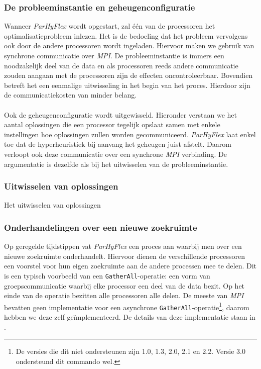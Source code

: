 \subsubsection{De probleeminstantie en geheugenconfiguratie}

Wanneer \emph{ParHyFlex} wordt opgestart, zal \'e\'en van de processoren het optimalisatieprobleem inlezen. Het is de bedoeling dat het probleem vervolgens ook door de andere processoren wordt ingeladen. Hiervoor maken we gebruik van synchrone communicatie over \emph{MPI}. De probleeminstantie is immers een noodzakelijk deel van de data en als processoren reeds andere communicatie zouden aangaan met de processoren zijn de effecten oncontroleerbaar. Bovendien betreft het een eenmalige uitwisseling in het begin van het proces. Hierdoor zijn de communicatiekosten van minder belang.

\paragraph{}
Ook de geheugenconfiguratie wordt uitgewisseld. Hieronder verstaan we het aantal oplossingen die een processor tegelijk opslaat samen met enkele instellingen hoe oplossingen zullen worden gecommuniceerd. \emph{ParHyFlex} laat enkel toe dat de hyperheuristiek bij aanvang het geheugen juist afstelt. Daarom verloopt ook deze communicatie over een synchrone \emph{MPI} verbinding. De argumentatie is dezelfde als bij het uitwisselen van de probleeminstantie.

\subsubsection{Uitwisselen van oplossingen}

Het uitwisselen van oplossingen %

\subsubsection{Onderhandelingen over een nieuwe zoekruimte}

Op geregelde tijdstippen vat \emph{ParHyFlex} een proces aan waarbij men over een nieuwe zoekruimte onderhandelt. Hiervoor dienen de verschillende processoren een voorstel voor hun eigen zoekruimte aan de andere processen mee te delen. Dit is een typisch voorbeeld van een \texttt{GatherAll}-operatie: een vorm van groepscommunicatie waarbij elke processor een deel van de data bezit. Op het einde van de operatie bezitten alle processoren alle delen. De meeste van \emph{MPI} bevatten geen implementatie voor een asynchrone \texttt{GatherAll}-operatie\footnote{De versies die dit niet ondersteunen zijn 1.0\cite{mpi10}, 1.3\cite{mpi13}, 2.0\cite{conf/europar/GeistGHLLSSS96,mpi20}, 2.1\cite{mpi21} en 2.2\cite{mpi22}. Versie 3.0\cite{mpi30} ondersteund dit commando wel.}, daarom hebben we deze zelf ge\"implementeerd. De details van deze implementatie staan in .

